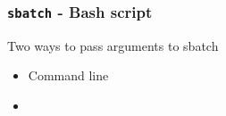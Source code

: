 \documentclass{beamer}
\newcommand{\code}[1]{\colorbox{codegray}{\texttt{#1}}}
\begin{document}
\begin{frame}
\frametitle{\code{sbatch} - Bash script}
Two ways to pass arguments to sbatch
\begin{itemize}
    \item Command line
    \bigskip
    \pause
    \item 
    \bigskip
\end{itemize}
\end{frame}
% 
%
%
%
%
%
%
%
\end{document}
